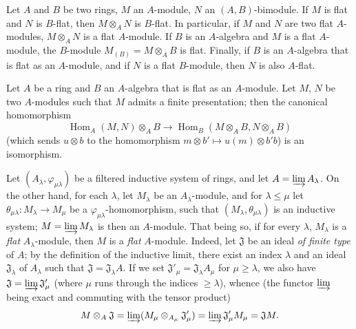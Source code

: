 \begin{env}[6.2.1]
\label{0.6.2.1}
Let $A$ and $B$ be two rings, $M$ an $A$-module, $N$ an
$(A,B)$-bimodule. If $M$ is flat and $N$ is $B$-flat, then
$M\otimes_A N$ is $B$-flat. In particular, if $M$ and $N$ are two
flat $A$-modules, $M\otimes_A N$ is a flat $A$-module. If $B$ is an
$A$-algebra and $M$ is
a flat $A$-module, the $B$-module $M_{(B)}=M\otimes_A B$ is flat. Finally, if
$B$ is an $A$-algebra that is flat as an $A$-module, and if $N$ is
a flat $B$-module, then $N$ is also $A$-flat.
\end{env}

\begin{env}[6.2.2]
\label{0.6.2.2}
Let $A$ be a ring and $B$ an $A$-algebra that is flat as an $A$-module.
Let $M$, $N$ be two $A$-modules such that $M$ admits a finite
presentation; then the canonical homomorphism
\[
  \operatorname{Hom}_A(M,N)\otimes_A B
  \longrightarrow
  \operatorname{Hom}_B(M\otimes_A B,N\otimes_A B)
  \tag{6.2.2.1}\label{0.6.2.2.1}
\]
(which sends $u\otimes b$ to the homomorphism
$m\otimes b'\longmapsto u(m)\otimes b'b$) is an isomorphism.
\end{env}

\begin{env}[6.2.3]
\label{0.6.2.3}
Let $(A_\lambda,\varphi_{\mu\lambda})$ be a filtered inductive system
of rings, and let $A=\varinjlim A_\lambda$. On the other hand, for each
$\lambda$, let $M_\lambda$ be an $A_\lambda$-module, and for $\lambda\leq\mu$ let
$\theta_{\mu\lambda}:M_\lambda\to M_\mu$ be a
$\varphi_{\mu\lambda}$-homomorphism, such that
$(M_\lambda,\theta_{\mu\lambda})$ is an inductive system;
$M=\varinjlim M_\lambda$ is then an $A$-module. That being so, if for every
$\lambda$, $M_\lambda$ is a \emph{flat} $A_\lambda$-module, then $M$ is
a \emph{flat} $A$-module. Indeed, let $\mathfrak{J}$ be an ideal \emph{of
finite type} of $A$; by the definition of the inductive limit, there exist an
index $\lambda$ and an ideal $\mathfrak{J}_\lambda$ of $A_\lambda$ such that
$\mathfrak{J}=\mathfrak{J}_\lambda A$. If we set
$\mathfrak{J}'_\mu=\mathfrak{J}_\lambda A_\mu$ for $\mu\geq\lambda$, we
also have $\mathfrak{J}=\varinjlim\mathfrak{J}'_\mu$ (where $\mu$ runs through the
indices $\geq\lambda$), whence (the functor $\varinjlim$ being exact and
commuting with the tensor product)
\[
  M\otimes_A\mathfrak{J}
  =\varinjlim(M_\mu\otimes_{A_\mu}\mathfrak{J}'_\mu)
  =\varinjlim\mathfrak{J}'_\mu M_\mu
  =\mathfrak{J}M.
\]
\end{env}

